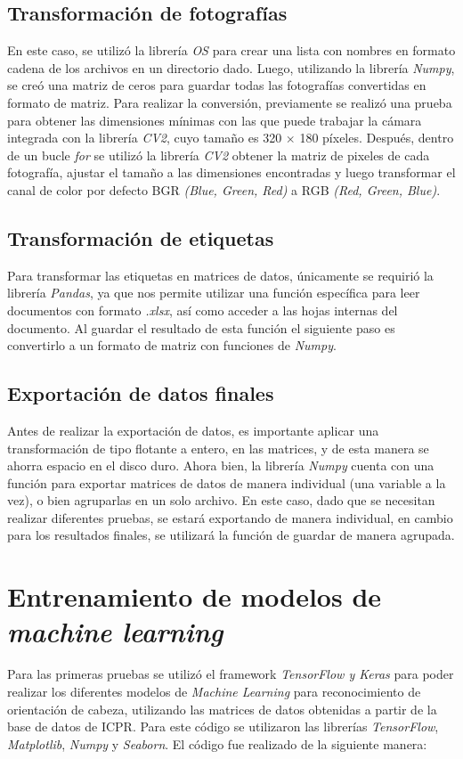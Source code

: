\subsection{Transformación de fotografías}
En este caso, se utilizó la librería \textit{OS} para crear una lista con nombres en formato cadena de los archivos en un directorio dado. Luego, utilizando la librería \textit{Numpy}, se creó una matriz de ceros para guardar todas las fotografías convertidas en formato de matriz. Para realizar la conversión, previamente se realizó una prueba para obtener las dimensiones mínimas con las que puede trabajar la cámara integrada con la librería \textit{CV2}, cuyo tamaño es 320 $\times$ 180 píxeles. Después, dentro de un bucle \textit{for} se utilizó la librería \textit{CV2} obtener la matriz de pixeles de cada fotografía, ajustar el tamaño a las dimensiones encontradas y luego transformar el canal de color por defecto BGR \textit{(Blue, Green, Red)} a RGB \textit{(Red, Green, Blue)}. 

\subsection{Transformación de etiquetas}

Para transformar las etiquetas en matrices de datos, únicamente se requirió la librería \textit{Pandas}, ya que nos permite utilizar una función específica para leer documentos con formato \textit{.xlsx}, así como acceder a las hojas internas del documento. Al guardar el resultado de esta función el siguiente paso es convertirlo a un formato de matriz con funciones de \textit{Numpy}. 

\subsection{Exportación de datos finales}

Antes de realizar la exportación de datos, es importante aplicar una transformación de tipo flotante a entero, en las matrices, y de esta manera se ahorra espacio en el disco duro. Ahora bien, la librería \textit{Numpy} cuenta con una función para exportar matrices de datos de manera individual (una variable a la vez), o bien agruparlas en un solo archivo. En este caso, dado que se necesitan realizar diferentes pruebas, se estará exportando de manera individual, en cambio para los resultados finales, se utilizará la función de guardar de manera agrupada. 

\section{Entrenamiento de modelos de \textit{machine learning}}
Para las primeras pruebas se utilizó el framework \textit{TensorFlow y Keras} para poder realizar los diferentes modelos de \textit{Machine Learning} para reconocimiento de orientación de cabeza, utilizando las matrices de datos obtenidas a partir de la base de datos de ICPR. Para este código se utilizaron las librerías \textit{TensorFlow}, \textit{Matplotlib}, \textit{Numpy} y \textit{Seaborn}. El código fue realizado de la siguiente manera:

